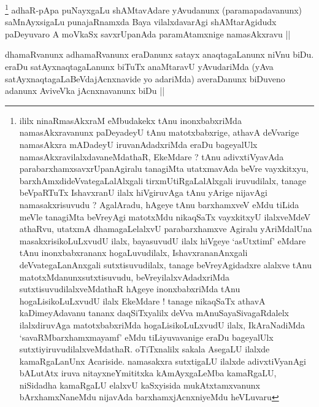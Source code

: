 


\begin{artha}
\footnote{ililx ninaRmasAkxraM eMbudakekx tAnu inonxbabxriMda
  namasAkxravanunx paDeyadeyU tAnu matotxbabxrige, athavA deVvarige
  namasAkxra mADadeyU iruvanAdadxriMda eraDu bageyalUlx
  namasAkxravilalxdavaneMdathaR, EkeMdare ? tAnu adivxtiVyavAda
  parabarxhamxsavxrUpanAgiralu tanagiMta utatxmavAda beVre vayxkitxyu,
  barxhAmxdideVvategaLalAlxgali tirxmUtiRgaLalAlxgali iruvudilalx,
  tanage beVpaRTuTx IshavxranU ilalx hiVgiruvAga tAnu yArige nijavAgi
  namasakxrisuvudu ? AgalAradu, hAgeye tAnu barxhamxveV eMdu tiLida
  meVle tanagiMta beVreyAgi matotxMdu nikaqSaTx vayxkitxyU ilalxveMdeV
  athaRvu, utatxmA dhamagaLelalxvU parabarxhamxve Agiralu yAriMdalUna
  masakxrisikoLuLxvudU ilalx, bayasuvudU ilalx hiVgeye `asUtxtimf'
  eMdare tAnu inonxbabxrananx hogaLuvudilalx, IshavxrananAnxgali
  deVvategaLanAnxgali sutxtisuvudilalx, tanage beVreyAgidadxre alalxve
  tAnu matotxMdanunxsutxtisuvudu, beVreyilalxvAdadxriMda
  sutxtisuvudilalxveMdathaR hAgeye inonxbabxriMda tAnu
  hogaLisikoLuLxvudU ilalx EkeMdare ! tanage nikaqSaTx athavA
  kaDimeyAdavanu tananx daqSiTxyalilx deVva mAnuSayaSivagaRdalelx
  ilalxdiruvAga matotxbabxriMda hogaLisikoLuLxvudU ilalx, IkAraNadiMda
  `savaRMbarxhamxmayamf' eMdu tiLiyuvavanige eraDu bageyalUlx
  sutxtiyiruvudilalxveMdathaR. oTiTxnalilx sakala AsegaLU ilalxde
  kamaRgaLanUnx Acariside. namasakxra sutxtigaLU ilalxde
  adivxtiVyanAgi bALutAtx iruva nitayxneYmititxka kAmAyxgaLeMba
  kamaRgaLU, niSidadha kamaRgaLU elalxvU kaSxyisida mukAtxtamxvanunx
  bArxhamxNaneMdu nijavAda barxhamxjAcnxniyeMdu heVLuvaru} adhaR-pApa puNayxgaLu shAMtavAdare yAvudanunx
(paramapadavanunx) saMnAyxsigaLu punajaRnamxda Baya vilalxdavarAgi
shAMtarAgidudx paDeyuvaro A moVkaSx savxrUpanAda paramAtamxnige
namasAkxravu ||
\end{artha}

\begin{artha}
dhamaRvanunx adhamaRvanunx eraDanunx satayx anaqtagaLanunx niVnu
biDu. eraDu satAyxnaqtagaLanunx biTuTx anaMtaravU yAvudariMda (yAva
satAyxnaqtagaLaBeVdajAcnxnavide yo adariMda) averaDanunx biDuveno
adanunx AviveVka jAcnxnavanunx biDu ||
\end{artha}

